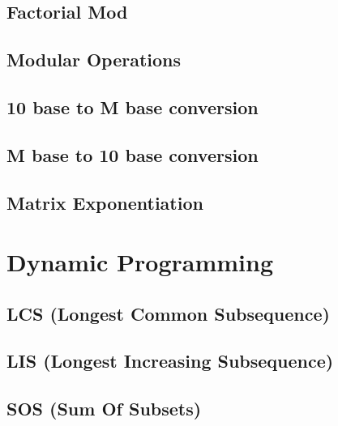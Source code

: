 \documentclass[10pt, a4paper,twocolumn]{article}
\begin{document}
\subsection{Factorial Mod}

\subsection{Modular Operations}


\subsection{10 base to M base conversion}


\subsection{M base to 10 base conversion}


\subsection{Matrix Exponentiation}




\section{Dynamic Programming}
\subsection{LCS (Longest \allowbreak Common Subsequence)}


\subsection{LIS (Longest \allowbreak Increasing Subsequence)}


\subsection{SOS (Sum \allowbreak Of Subsets)}

\end{document}
